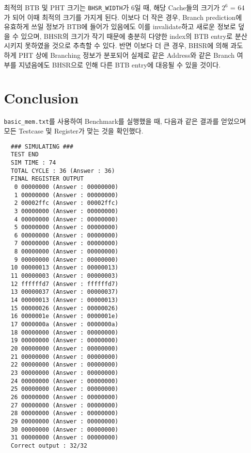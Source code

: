 \documentclass{scrartcl}
\begin{document}
최적의 BTB 및 PHT 크기는 \texttt{BHSR\_WIDTH}가 6일 때, 해당 Cache들의 크기가 $2^6$ = 64가 되어 이때 최적의 크기를 가지게 된다.
이보다 더 작은 경우, Branch prediction에 유효하게 쓰일 정보가 BTB에 들어가 있음에도 이를 invalidate하고 새로운 정보로 덮을 수 있으며, BHSR의 크기가 작기 때문에 충분히 다양한 index의 BTB entry로 분산시키지 못하였을 것으로 추측할 수 있다.
반면 이보다 더 큰 경우, BHSR에 의해 과도하게 PHT 상에 Branching 정보가 분포되어 실제로 같은 Address와 같은 Branch 여부를 지녔음에도 BHSR으로 인해 다른 BTB entry에 대응될 수 있을 것이다. 

\section{Conclusion}
\texttt{basic\_mem.txt}를 사용하여 Benchmark를 실행했을 때, 다음과 같은 결과를 얻었으며 모든 Testcase 및 Register가 맞는 것을 확인했다.
\begin{lstlisting}
  ### SIMULATING ###
  TEST END
  SIM TIME : 74
  TOTAL CYCLE : 36 (Answer : 36)
  FINAL REGISTER OUTPUT
   0 00000000 (Answer : 00000000)
   1 00000000 (Answer : 00000000)
   2 00002ffc (Answer : 00002ffc)
   3 00000000 (Answer : 00000000)
   4 00000000 (Answer : 00000000)
   5 00000000 (Answer : 00000000)
   6 00000000 (Answer : 00000000)
   7 00000000 (Answer : 00000000)
   8 00000000 (Answer : 00000000)
   9 00000000 (Answer : 00000000)
  10 00000013 (Answer : 00000013)
  11 00000003 (Answer : 00000003)
  12 ffffffd7 (Answer : ffffffd7)
  13 00000037 (Answer : 00000037)
  14 00000013 (Answer : 00000013)
  15 00000026 (Answer : 00000026)
  16 0000001e (Answer : 0000001e)
  17 0000000a (Answer : 0000000a)
  18 00000000 (Answer : 00000000)
  19 00000000 (Answer : 00000000)
  20 00000000 (Answer : 00000000)
  21 00000000 (Answer : 00000000)
  22 00000000 (Answer : 00000000)
  23 00000000 (Answer : 00000000)
  24 00000000 (Answer : 00000000)
  25 00000000 (Answer : 00000000)
  26 00000000 (Answer : 00000000)
  27 00000000 (Answer : 00000000)
  28 00000000 (Answer : 00000000)
  29 00000000 (Answer : 00000000)
  30 00000000 (Answer : 00000000)
  31 00000000 (Answer : 00000000)
  Correct output : 32/32
\end{lstlisting}
\end{document}
